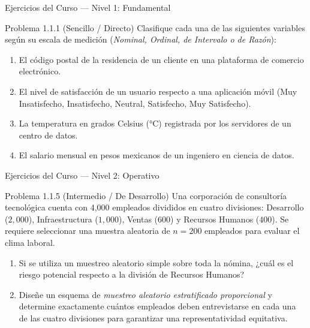 \begin{frame}{Ejercicios del Curso — Nivel 1: Fundamental}
  \begin{block}{Problema 1.1.1 (Sencillo / Directo)}
    Clasifique cada una de las siguientes variables según su escala de medición (\emph{Nominal, Ordinal, de Intervalo o de Razón}):
    \begin{enumerate}
      \item El código postal de la residencia de un cliente en una plataforma de comercio electrónico.
      \item El nivel de satisfacción de un usuario respecto a una aplicación móvil (Muy Insatisfecho, Insatisfecho, Neutral, Satisfecho, Muy Satisfecho).
      \item La temperatura en grados Celsius (°C) registrada por los servidores de un centro de datos.
      \item El salario mensual en pesos mexicanos de un ingeniero en ciencia de datos.
    \end{enumerate}
  \end{block}
\end{frame}

\begin{frame}{Ejercicios del Curso — Nivel 2: Operativo}
  \vspace{-0.2em}
  \small
  \begin{block}{Problema 1.1.5 (Intermedio / De Desarrollo)}
    Una corporación de consultoría tecnológica cuenta con 4,000 empleados divididos en cuatro divisiones: Desarrollo ($2,000$), Infraestructura ($1,000$), Ventas ($600$) y Recursos Humanos ($400$). Se requiere seleccionar una muestra aleatoria de $n = 200$ empleados para evaluar el clima laboral.
    \begin{enumerate}
      \item Si se utiliza un muestreo aleatorio simple sobre toda la nómina, ¿cuál es el riesgo potencial respecto a la división de Recursos Humanos?
      \item Diseñe un esquema de \emph{muestreo aleatorio estratificado proporcional} y determine exactamente cuántos empleados deben entrevistarse en cada una de las cuatro divisiones para garantizar una representatividad equitativa.
    \end{enumerate}
  \end{block}
\end{frame}

